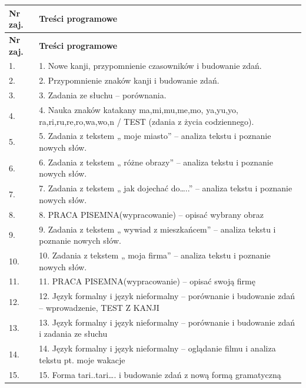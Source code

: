 \documentclass[12pt, a4paper]{article}
\newcommand{\thdrule}{\noalign{\global\setlength{\extrarowheight}{0pt}}}
\newcommand{\thdend}{\noalign{\global\setlength{\extrarowheight}{3pt}}}
\begin{document}
{\scriptsize
\begin{longtable}{m{1.5cm}m{14.5cm}}
\thdrule\toprule
\rowcolor{pjatkRed} {\color{white}\textbf{Nr zaj.}} & {\color{white}\textbf{Treści programowe}} \\
\midrule\thdend
\endfirsthead
\thdrule\toprule
\rowcolor{pjatkRed} {\color{white}\textbf{Nr zaj.}} & {\color{white}\textbf{Treści programowe}} \\
\midrule\thdend
\endhead
  \rowcolor{tableRowLight} 1. & 1. Nowe kanji, przypomnienie czasowników i budowanie zdań. \\
  \rowcolor{tableRowAlt} 2. & 2. Przypomnienie znaków kanji i budowanie zdań. \\
  \rowcolor{tableRowLight} 3. & 3. Zadania ze słuchu – porównania. \\
  \rowcolor{tableRowAlt} 4. & 4. Nauka znaków katakany ma,mi,mu,me,mo, ya,yu,yo, ra,ri,ru,re,ro,wa,wo,n / TEST (zdania z życia codziennego). \\
  \rowcolor{tableRowLight} 5. & 5.  Zadania z tekstem „ moje miasto” – analiza tekstu i poznanie nowych słów. \\
  \rowcolor{tableRowAlt} 6. & 6.  Zadania z tekstem „ różne obrazy” – analiza tekstu i poznanie nowych słów. \\
  \rowcolor{tableRowLight} 7. & 7.  Zadania z tekstem „ jak dojechać do…..” – analiza tekstu i poznanie nowych słów. \\
  \rowcolor{tableRowAlt} 8. & 8.  PRACA PISEMNA(wypracowanie) – opisać wybrany obraz \\
  \rowcolor{tableRowLight} 9. & 9.  Zadania z tekstem „ wywiad z mieszkańcem” – analiza tekstu i poznanie nowych słów. \\
  \rowcolor{tableRowAlt} 10. & 10.  Zadania z tekstem „ moja firma” – analiza tekstu i poznanie nowych słów. \\
  \rowcolor{tableRowLight} 11. & 11.  PRACA PISEMNA(wypracowanie) – opisać swoją firmę \\
  \rowcolor{tableRowAlt} 12. & 12.  Język formalny i język nieformalny – porównanie i budowanie zdań – wprowadzenie, TEST Z KANJI \\
  \rowcolor{tableRowLight} 13. & 13.  Język formalny i język nieformalny – porównanie i budowanie zdań i zadania ze słuchu \\
  \rowcolor{tableRowAlt} 14. & 14.  Język formalny i język nieformalny – oglądanie filmu i analiza tekstu pt. moje wakacje \\
  \rowcolor{tableRowLight} 15. & 15.  Forma tari..tari…. i budowanie zdań z nową formą gramatyczną \\

\end{longtable}}
\end{document}
